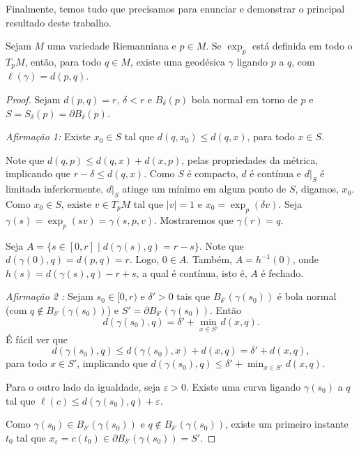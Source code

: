Finalmente, temos tudo que precisamos para enunciar e demonstrar o principal resultado deste trabalho.
\begin{lemma}
    \label{lem:hopf-rinow}
    Sejam $M$ uma variedade Riemanniana e $p \in M$. Se $\exp_p$ está definida em todo o $T_pM$, então, para todo $q \in M$, existe uma geodésica $\gamma$ ligando $p$ a $q$, com $\ell(\gamma) = d(p,q)$.
    \begin{proof}

        Sejam $d(p,q) = r$, $\delta<r$ e $B_\delta(p)$ bola normal em torno de $p$ e $S = S_\delta(p) = \partial B_\delta(p)$.

        \emph{Afirmação 1:} Existe $x_0 \in S$ tal que $d(q, x_0) \leq d(q, x)$, para todo $x \in S$.

        Note que $d(q,p) \leq d(q,x) + d(x,p)$, pelas propriedades da métrica, implicando que $r - \delta \leq d(q,x)$.
        Como $S$ é compacto, $d$ é contínua e $d|_S$ é limitada inferiormente, $d|_S$ atinge um mínimo em algum ponto de $S$, digamos, $x_0$.
        Como $x_0 \in S$, existe $v \in T_pM$ tal que $|v| = 1$ e $x_0 = \exp_p (\delta v)$.
        Seja $\gamma(s) = \exp_p(sv) = \gamma(s,p,v)$. Mostraremos que $\gamma(r) = q$.

        Seja $A = \{s \in [0,r] \mid d(\gamma(s), q) = r - s\}$.
        Note que $d(\gamma(0), q) = d(p,q) = r$. Logo, $0 \in A$.
        Também, $A = h^{-1}(0)$, onde $h(s) = d(\gamma(s), q) - r + s$, a qual é contínua, isto é, $A$ é fechado.

        \emph{Afirmação 2 :} Sejam $s_0 \in [0,r)$ e $\delta' > 0$ tais que $B_{\delta'}(\gamma(s_0))$ é bola normal (com $q \notin B_{\delta'}(\gamma(s_0))$) e $S' = \partial B_{\delta'}(\gamma(s_0))$. Então
        \begin{equation*}
            d(\gamma(s_0), q) = \delta' + \min_{x \in S'} d(x,q).
        \end{equation*}
        É fácil ver que
        \begin{equation*}
            d(\gamma(s_0), q) \leq d(\gamma(s_0), x) + d(x, q) = \delta' + d(x,q),
        \end{equation*}
        para todo $x \in S'$, implicando que $d(\gamma(s_0), q) \leq \delta' + \min_{x \in S'} d(x,q)$.

        Para o outro lado da igualdade, seja $\varepsilon > 0$. Existe uma curva ligando $\gamma(s_0)$ a $q$ tal que $\ell(c) \leq d(\gamma(s_0), q) + \varepsilon$.

        Como $\gamma(s_0) \in B_{\delta'}(\gamma(s_0))$ e $q \notin B_{\delta'}(\gamma(s_0))$, existe um primeiro instante $t_0$ tal que $x_\varepsilon = c(t_0) \in \partial B_{\delta'}(\gamma(s_0)) = S'$.


\end{proof}
\end{lemma}
